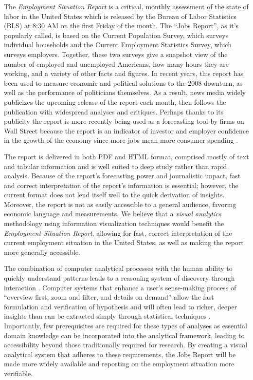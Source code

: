 \documentclass{sigchi}
\newcommand\Ben[1]{{\color{blue}#1}}	%
\begin{document}
\Ben{The \textit{Employment Situation Report} is a critical, monthly assessment of the state of labor in the United States which is released by the Bureau of Labor Statistics (BLS) at 8:30 AM on the first Friday of the month. The ``Jobs Report'', as it's popularly called, is based on the Current Population Survey, which surveys individual households and the Current Employment Statistics Survey, which surveys employers. Together, these two surveys give a snapshot view of the number of employed and unemployed Americans, how many hours they are working, and a variety of other facts and figures. In recent years, this report has been used to measure economic and political solutions to the 2008 downturn, as well as the performance of politicians themselves. As a result, news media widely publicizes the upcoming release of the report each month, then follows the publication with widespread analyses and critiques. Perhaps thanks to its publicity the report is more recently being used as a forecasting tool by firms on Wall Street because the report is an indicator of investor and employer confidence in the growth of the economy since more jobs mean more consumer spending \cite{mahorney_what_2013}.

The report is delivered in both PDF and HTML format, comprised mostly of text and tabular information and is well suited to deep study rather than rapid analysis. Because of the report's forecasting power and journalistic impact, fast and correct interpretation of the report's information is essential; however, the current format does not lend itself well to the quick derivation of insights. Moreover, the report is not as easily accessible to a general audience, favoring economic language and measurements. We believe that a \textit{visual analytics} methodology \cite{keim_mastering_2010} using information visualization techniques would benefit the \textit{Employment Situation Report}, allowing for fast, correct interpretation of the current employment situation in the United States, as well as making the report more generally accessible.

The combination of computer analytical processes with the human ability to quickly understand patterns leads to a reasoning system of discovery through interaction \cite{green_visual_2008}. Computer systems that enhance a user's sense-making process of ``overview first, zoom and filter, and details on demand'' allow the fast formulation and verification of hypothesis and will often lead to richer, deeper insights than can be extracted simply through statistical techniques \cite{heer_interactive_2012}. Importantly, few prerequisites are required for these types of analyses as essential domain knowledge can be incorporated into the analytical framework, leading to accessibility beyond those traditionally required for research. By creating a visual analytical system that adheres to these requirements, the Jobs Report will be made more widely available and reporting on the employment situation more verifiable.}
\end{document}
